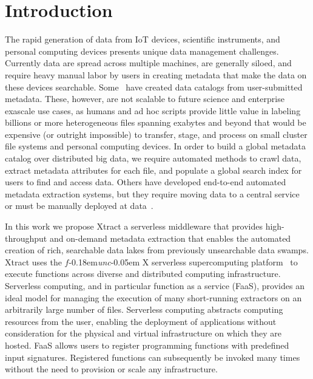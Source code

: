 \documentclass[sigconf]{acmart}
\newcommand{\tyler}[1]{}
\newcommand{\tyler}[1]{{\textcolor{cyan}{ tyler: #1 }}}
\newcommand{\name}{Xtract}
\newcommand{\funcx}{$f$\kern-0.18em\emph{unc}\kern-0.05em X}
\begin{document}


\maketitle


\section{Introduction}

The rapid generation of data from IoT devices, scientific instruments, and personal computing devices presents unique 
data management challenges. Currently data are spread across multiple machines, are generally siloed, and require 
heavy manual labor by users in creating metadata that make the data on these devices searchable. Some~\cite{egan2003vizier, welter2013nhgri, irods, dataverse}  have created data catalogs from user-submitted metadata. These, however, are not scalable to future science and enterprise 
exascale use cases, as humans and ad hoc scripts provide little value in labeling billions or more heterogeneous files spanning exabytes and beyond
that would be expensive (or outright impossible) to transfer, stage, and process on small cluster file systems and personal computing devices.  
In order to build a global metadata catalog over distributed big data, we require automated methods to crawl data, extract 
metadata attributes for each file, and populate a global search index for users to find and access data. Others have developed end-to-end 
automated metadata extraction systems, but they require moving data to a central service~\cite{skluzacek2018skluma, skluzacek2016klimatic, padhy2015brown, rodrigo2018sciencesearch} or must be manually deployed at data~\cite{mattmann2011tika}. 

\tyler{un-plagiarize the serverless sentences}
In this work we propose \name{}
a serverless middleware that provides high-throughput and on-demand metadata 
extraction that enables the automated creation of rich, searchable data lakes from previously unsearchable data swamps. 
\name{} uses the \funcx{} serverless supercomputing platform~\cite{chard2019serverless}
to execute functions across diverse and distributed computing infrastructure.
Serverless computing, and in particular function as a service (FaaS),
provides an ideal model for managing the execution of
many short-running extractors on an arbitrarily large number of files. 
Serverless computing abstracts computing resources from the user, enabling
the deployment of applications without consideration for the physical and virtual infrastructure on which 
they are hosted. FaaS allows users to register programming functions with predefined input signatures.
Registered functions can subsequently be invoked many times
without the need to provision or scale any infrastructure.
\end{document}
